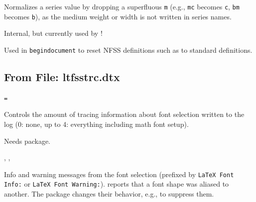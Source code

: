 \documentclass{l3in2edoc}
\begin{document}
\begin{function}[int]
  {
    \series@maybe@drop@one@m
  }
  \begin{syntax}
     
  \end{syntax}
  Normalizes a series value by dropping a superfluous \texttt{m}
  (e.g., \texttt{mc} becomes \texttt{c}, \texttt{bm} becomes
  \texttt{b}), as the medium weight or width is not written in series
  names.

  Internal, but currently used by !
\end{function}



\begin{function}[int]
  {
    \reinstall@nfss@defs
  }
%
  Used in \texttt{begindocument} to reset NFSS definitions such as
   to standard definitions.
\end{function}



\subsection{From File: ltfsstrc.dtx}


\begin{function}[user]
  {
    \tracingfonts
  }
  \begin{syntax}
    \texttt{=}
  \end{syntax}
  Controls the amount of tracing information about font selection
  written to the log (0: none, up to 4: everything including math
  font setup).

  Needs  package.
\end{function}






\begin{function}[]
  {
    \@font@aliasinfo,
    \@font@info,
    \@font@warning
  }
  \begin{syntax}
     
  \end{syntax}
  Info and warning messages from the font selection (prefixed by
  \texttt{LaTeX Font Info:} or \texttt{LaTeX Font Warning:}).
   reports that a font shape was aliased to
  another. The  package changes their behavior, e.g.,
  to suppress them.
\end{function}
\end{document}
